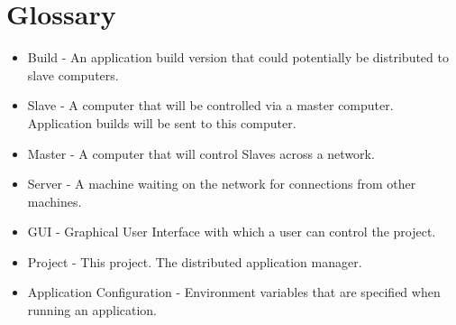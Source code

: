 \documentclass[a4paper,12pt,final]{article}
\begin{document}









\newpage

\section{Glossary}
\begin{itemize}
\item{Build - An application build version that could potentially be distributed to slave computers.}
\item{Slave - A computer that will be controlled via a master computer. Application builds will be sent to this computer.}
\item{Master - A computer that will control Slaves across a network.}
\item{Server - A machine waiting on the network for connections from other machines.}
\item{GUI - Graphical User Interface with which a user can control the project.}
\item{Project - This project. The distributed application manager.}
\item{Application Configuration - Environment variables that are specified when running an application.}
\end{itemize}
\end{document}
